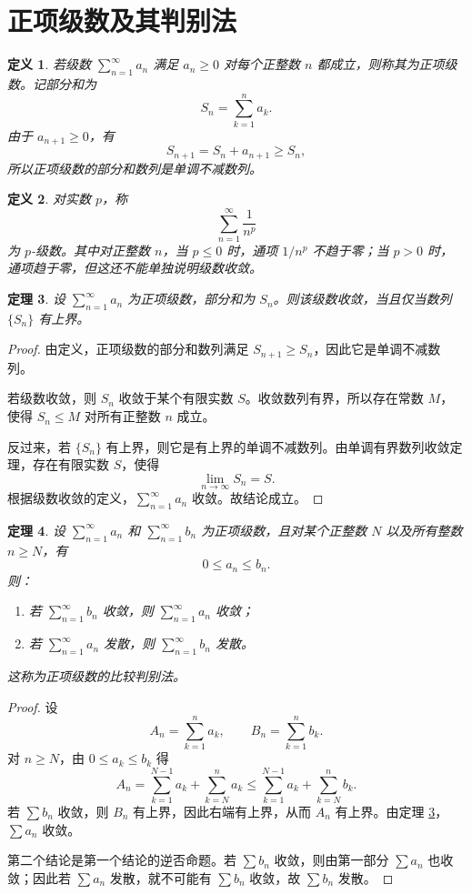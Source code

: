 \documentclass[UTF8,fontset=fandol,11pt]{ctexart}
\newtheorem{definition}{定义}[section]
\newtheorem{theorem}[definition]{定理}
\begin{document}
\section{正项级数及其判别法}\label{sec:S03}
\begin{definition}
若级数 $\sum_{n=1}^{\infty}a_n$ 满足 $a_n\geq 0$ 对每个正整数 $n$ 都成立，则称其为正项级数。记部分和为
\[
S_n=\sum_{k=1}^{n}a_k.
\]
由于 $a_{n+1}\geq0$，有
\[
S_{n+1}=S_n+a_{n+1}\geq S_n,
\]
所以正项级数的部分和数列是单调不减数列。\label{def:positive-series}
\end{definition}
\begin{definition}
对实数 $p$，称
\[
\sum_{n=1}^{\infty}\frac{1}{n^p}
\]
为 $p$-级数。其中对正整数 $n$，当 $p\leq0$ 时，通项 $1/n^p$ 不趋于零；当 $p>0$ 时，通项趋于零，但这还不能单独说明级数收敛。\label{def:p-series}
\end{definition}
\begin{theorem}
设 $\sum_{n=1}^{\infty}a_n$ 为正项级数，部分和为 $S_n$。则该级数收敛，当且仅当数列 $\{S_n\}$ 有上界。\label{thm:monotone-partial-sums}
\end{theorem}
\begin{proof}
由定义，正项级数的部分和数列满足 $S_{n+1}\geq S_n$，因此它是单调不减数列。

若级数收敛，则 $S_n$ 收敛于某个有限实数 $S$。收敛数列有界，所以存在常数 $M$，使得 $S_n\leq M$ 对所有正整数 $n$ 成立。

反过来，若 $\{S_n\}$ 有上界，则它是有上界的单调不减数列。由单调有界数列收敛定理，存在有限实数 $S$，使得
\[
\lim_{n\to\infty}S_n=S.
\]
根据级数收敛的定义，$\sum_{n=1}^{\infty}a_n$ 收敛。故结论成立。
\end{proof}
\begin{theorem}
设 $\sum_{n=1}^{\infty}a_n$ 和 $\sum_{n=1}^{\infty}b_n$ 为正项级数，且对某个正整数 $N$ 以及所有整数 $n\geq N$，有
\[
0\leq a_n\leq b_n.
\]
则：
\begin{enumerate}
\item 若 $\sum_{n=1}^{\infty}b_n$ 收敛，则 $\sum_{n=1}^{\infty}a_n$ 收敛；
\item 若 $\sum_{n=1}^{\infty}a_n$ 发散，则 $\sum_{n=1}^{\infty}b_n$ 发散。
\end{enumerate}
这称为正项级数的比较判别法。\label{thm:comparison}
\end{theorem}
\begin{proof}
设
\[
A_n=\sum_{k=1}^{n}a_k,\qquad B_n=\sum_{k=1}^{n}b_k.
\]
对 $n\geq N$，由 $0\leq a_k\leq b_k$ 得
\[
A_n=\sum_{k=1}^{N-1}a_k+\sum_{k=N}^{n}a_k
\leq \sum_{k=1}^{N-1}a_k+\sum_{k=N}^{n}b_k.
\]
若 $\sum b_n$ 收敛，则 $B_n$ 有上界，因此右端有上界，从而 $A_n$ 有上界。由定理 \ref{thm:monotone-partial-sums}，$\sum a_n$ 收敛。

第二个结论是第一个结论的逆否命题。若 $\sum b_n$ 收敛，则由第一部分 $\sum a_n$ 也收敛；因此若 $\sum a_n$ 发散，就不可能有 $\sum b_n$ 收敛，故 $\sum b_n$ 发散。
\end{proof}
\end{document}
